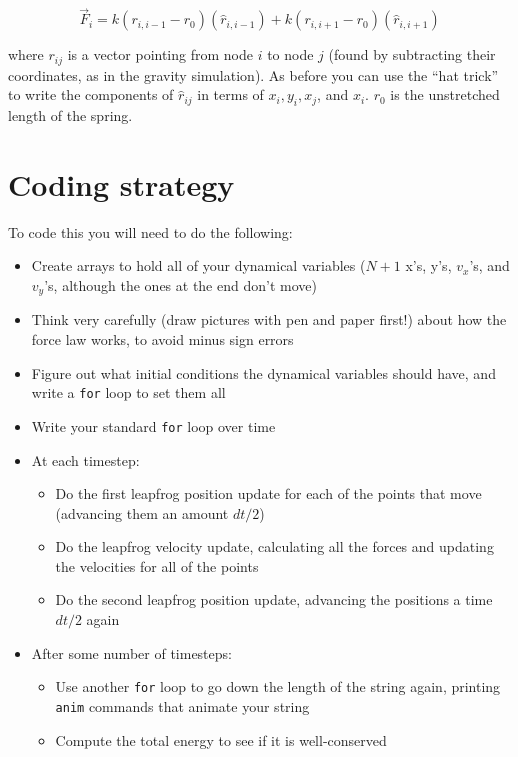 \documentclass[12ampt]{article}
\begin{document}
\begin{equation}
  \vec F_i = k(r_{i,i-1}-r_0) (\hat r_{i,i-1}) + k(r_{i,i+1}-r_0) (\hat r_{i,i+1})
\end{equation}

where $r_{ij}$ is a vector pointing from node $i$ to node $j$ (found by 
subtracting their coordinates, as in the gravity simulation). As before you 
can use the ``hat trick'' to write the components of $\hat r_{ij}$ in terms
of $x_i, y_i, x_j$, and $x_i$. $r_0$ is the unstretched length of the spring.

\section{Coding strategy}

To code this you will need to do the following:

\begin{itemize}
  \item{Create arrays to hold all of your dynamical variables ($N+1$ x's, y's, $v_x$'s, and $v_y$'s, although the ones at the end don't move)}
  \item{Think very carefully (draw pictures with pen and paper first!) about how the force law works, to avoid minus sign errors}
  \item{Figure out what initial conditions the dynamical variables should have, and write a {\tt for} loop to set them all}
  \item{Write your standard {\tt for} loop over time}
  \item{At each timestep:}
    \begin{itemize}
\item Do the first leapfrog position update for each of the points that move (advancing them an amount $dt/2$)
\item Do the leapfrog velocity update, calculating all the forces and updating the velocities for all of the points
\item Do the second leapfrog position update, advancing the positions a time $dt/2$ again
    \end{itemize}
  \item{After some number of timesteps:}
    \begin{itemize}
      \item{Use another {\tt for} loop to go down the length of the string again, printing {\tt anim} commands that animate your string}
      \item{Compute the total energy to see if it is well-conserved}
    \end{itemize}
\end{itemize}
\end{document}
